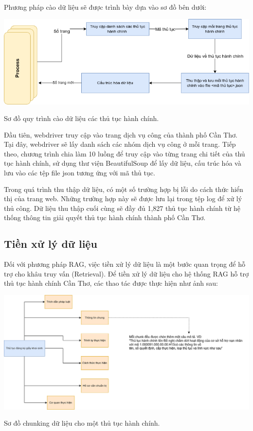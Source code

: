 \documentclass[a4paper, 12pt, openany]{book}
\begin{document}
Phương pháp cào dữ liệu sẽ được trình bày dựa vào sơ đồ bên dưới:

\begin{minipage}{\linewidth}
    \centering
    \includegraphics[width=14cm]{./assets/images/procedure-crawl.png}
    \captionsetup{type=figure}
    \caption{Sơ đồ quy trình cào dữ liệu các thủ tục hành chính.}
\end{minipage}

Đầu tiên, webdriver truy cập vào trang dịch vụ công của thành phố Cần Thơ. Tại đây, webdriver sẽ lấy danh sách các nhóm dịch vụ công ở mỗi trang.
Tiếp theo, chương trình chia làm 10 luồng để truy cập vào từng trang chi tiết của thủ tục hành chính, sử dụng thư viện BeautifulSoup để lấy dữ liệu, cấu trúc hóa và lưu vào các tệp file json tương ứng với mã thủ tục.

Trong quá trình thu thập dữ liệu, có một số trường hợp bị lỗi do cách thức hiển thị của trang web. Những trường hợp này sẽ được lưu lại trong tệp log để xử lý thủ công. Dữ liệu thu thập cuối cùng sẽ đầy đủ 1,827 thủ tục hành chính từ hệ thống thông tin giải quyết thủ tục hành chính thành phố Cần Thơ.
\subsection{Tiền xử lý dữ liệu}

Đối với phương pháp RAG, việc tiền xử lý dữ liệu là một bước quan trọng để hỗ trợ cho khâu truy vấn (Retrieval).
Để tiền xử lý dữ liệu cho hệ thống RAG hỗ trợ thủ tục hành chính Cần Thơ, các thao tác được thực hiện như ảnh sau:

\begin{minipage}{\linewidth}
    \centering
    \includegraphics[width=\linewidth]{./assets/images/preprocess.drawio.png}
    \captionsetup{type=figure}
    \caption{Sơ đồ chunking dữ liệu cho một thủ tục hành chính.}
\end{minipage}
\end{document}
